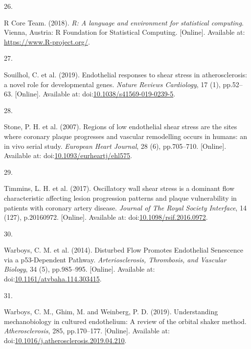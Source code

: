 \documentclass[
  11pt,
]{article}
\newlength{\cslhangindent}
\newlength{\csllabelwidth}
\newlength{\cslentryspacingunit} %
\newenvironment{CSLReferences}[2] %
 {%
  \setlength{\parindent}{0pt}
  \ifodd #1
  \let\oldpar\par
  \def\par{\hangindent=\cslhangindent\oldpar}
  \fi
  \setlength{\parskip}{#2\cslentryspacingunit}
 }%
 {}
\newcommand{\CSLLeftMargin}[1]{\parbox[t]{\csllabelwidth}{#1}}
\newcommand{\CSLRightInline}[1]{\parbox[t]{\linewidth - \csllabelwidth}{#1}\break}
\begin{document}
\begin{CSLReferences}{0}{0}
\leavevmode{}%
\CSLLeftMargin{26. }
\CSLRightInline{R Core Team. (2018). {\emph{R: A language and environment for statistical computing}}. Vienna, Austria: R Foundation for Statistical Computing. {[}Online{]}. Available at: \url{https://www.R-project.org/}.}

\leavevmode{}%
\CSLLeftMargin{27. }
\CSLRightInline{Souilhol, C. {et al.} (2019). {Endothelial responses to shear stress in atherosclerosis: a novel role for developmental genes}. \emph{Nature Reviews Cardiology}, 17 (1), pp.52--63. {[}Online{]}. Available at: doi:\href{https://doi.org/10.1038/s41569-019-0239-5}{10.1038/s41569-019-0239-5}.}

\leavevmode{}%
\CSLLeftMargin{28. }
\CSLRightInline{Stone, P. H. {et al.} (2007). {Regions of low endothelial shear stress are the sites where coronary plaque progresses and vascular remodelling occurs in humans: an in vivo serial study}. \emph{European Heart Journal}, 28 (6), pp.705--710. {[}Online{]}. Available at: doi:\href{https://doi.org/10.1093/eurheartj/ehl575}{10.1093/eurheartj/ehl575}.}

\leavevmode{}%
\CSLLeftMargin{29. }
\CSLRightInline{Timmins, L. H. {et al.} (2017). {Oscillatory wall shear stress is a dominant flow characteristic affecting lesion progression patterns and plaque vulnerability in patients with coronary artery disease}. \emph{Journal of The Royal Society Interface}, 14 (127), p.20160972. {[}Online{]}. Available at: doi:\href{https://doi.org/10.1098/rsif.2016.0972}{10.1098/rsif.2016.0972}.}

\leavevmode{}%
\CSLLeftMargin{30. }
\CSLRightInline{Warboys, C. M. {et al.} (2014). {Disturbed Flow Promotes Endothelial Senescence via a p53-Dependent Pathway}. \emph{Arteriosclerosis, Thrombosis, and Vascular Biology}, 34 (5), pp.985--995. {[}Online{]}. Available at: doi:\href{https://doi.org/10.1161/atvbaha.114.303415}{10.1161/atvbaha.114.303415}.}

\leavevmode{}%
\CSLLeftMargin{31. }
\CSLRightInline{Warboys, C. M., Ghim, M. and Weinberg, P. D. (2019). {Understanding mechanobiology in cultured endothelium: A review of the orbital shaker method}. \emph{Atherosclerosis}, 285, pp.170--177. {[}Online{]}. Available at: doi:\href{https://doi.org/10.1016/j.atherosclerosis.2019.04.210}{10.1016/j.atherosclerosis.2019.04.210}.}


\end{CSLReferences}
\end{document}
